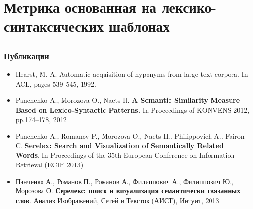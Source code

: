    
\section[PatternSim]{Метрика основанная на лексико-синтаксических шаблонах}

\subsection{}

\begin{frame}
\frametitle{Публикации}

\begin{itemize}
  \item Hearst, M. A. Automatic acquisition of hyponyms from large text corpora. In ACL,
pages 539–545, 1992. 
\item Panchenko A., Morozova O., Naets H. \textbf{A Semantic Similarity Measure Based on Lexico-Syntactic Patterns.} In Proceedings of KONVENS 2012, pp.174--178, 2012
\item Panchenko A., Romanov P., Morozova O., Naets H., Philippovich A., Fairon
C. \textbf{Serelex: Search and Visualization of Semantically Related Words}.
In Proceedings of the 35th European Conference on Information Retrieval (ECIR 2013).

\item Панченко А., Романов П., Романов А.,  Филиппович А.,
Филиппович Ю., Морозова О. \textbf{Серелекс: поиск и визуализация
семантически связанных слов}. Анализ Изображений, Сетей и Текстов (АИСТ), Интуит, 2013
\end{itemize}
\end{frame}

